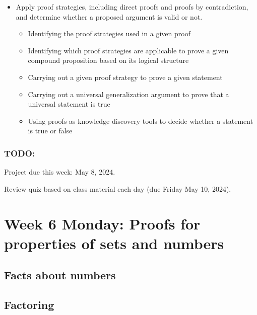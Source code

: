 \begin{itemize}
\item Apply proof strategies, including direct proofs and proofs by contradiction, and determine whether a proposed argument is valid or not.
\begin{itemize}
    \item Identifying the proof strategies used in a given proof
    \item Identifying which proof strategies are applicable to prove a given compound proposition based on its logical structure
    \item Carrying out a given proof strategy to prove a given statement
    \item Carrying out a universal generalization argument to prove that a universal statement is true
    \item Using proofs as knowledge discovery tools to decide whether a statement is true or false
\end{itemize}
\end{itemize}

\subsubsection*{TODO:}
\begin{list}
   {\itemsep2pt}
   \item Project due this week: May 8, 2024. 
   \item Review quiz based on class material each day (due Friday May 10, 2024).
\end{list}

\newpage

\section*{Week 6 Monday: Proofs for properties of sets and numbers}



\subsection*{Facts about numbers}


\newpage
\subsection*{Factoring}







\newpage



